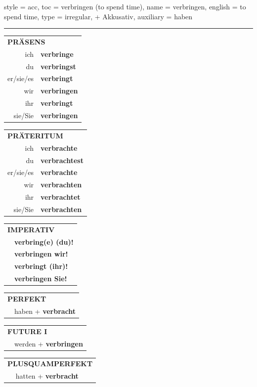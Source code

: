 \begin{verbentry}{
  style = {acc},
  toc = {verbringen (to spend time)},
  name = {verbringen},
  english = {to spend time},
  type = {irregular, + Akkusativ},
  auxiliary = {haben}
}


\vspace{5pt}
\hrule
\vspace{5pt}

\begin{tabular}{rl}
\multicolumn{2}{l}{\textbf{PRÄSENS}}\\
ich & \textbf{verbringe}\\
du & \textbf{verbringst}\\
er/sie/es & \textbf{verbringt}\\
wir & \textbf{verbringen}\\
ihr & \textbf{verbringt}\\
sie/Sie & \textbf{verbringen}\\
\end{tabular}
\hfill
\begin{tabular}{rl}
\multicolumn{2}{l}{\textbf{PRÄTERITUM}}\\
ich & \textbf{verbrachte}\\
du & \textbf{verbrachtest}\\
er/sie/es & \textbf{verbrachte}\\
wir & \textbf{verbrachten}\\
ihr & \textbf{verbrachtet}\\
sie/Sie & \textbf{verbrachten}\\
\end{tabular}
\hfill
\begin{tabular}{rl}
\multicolumn{2}{l}{\textbf{IMPERATIV}}\\
& \textbf{verbring(e) (du)!}\\
& \textbf{verbringen wir!}\\
& \textbf{verbringt (ihr)!}\\
& \textbf{verbringen Sie!}\\
\end{tabular}

\vspace{10pt}

\begin{tabular}{rl}
\multicolumn{2}{l}{\textbf{PERFEKT}}\\
& haben + \textbf{verbracht}\\
\end{tabular}
\hfill
\begin{tabular}{rl}
\multicolumn{2}{l}{\textbf{FUTURE I}}\\
& werden + \textbf{verbringen}\\
\end{tabular}
\hfill
\begin{tabular}{rl}
\multicolumn{2}{l}{\textbf{PLUSQUAMPERFEKT}}\\
& hatten + \textbf{verbracht}\\
\end{tabular}


\end{verbentry}
